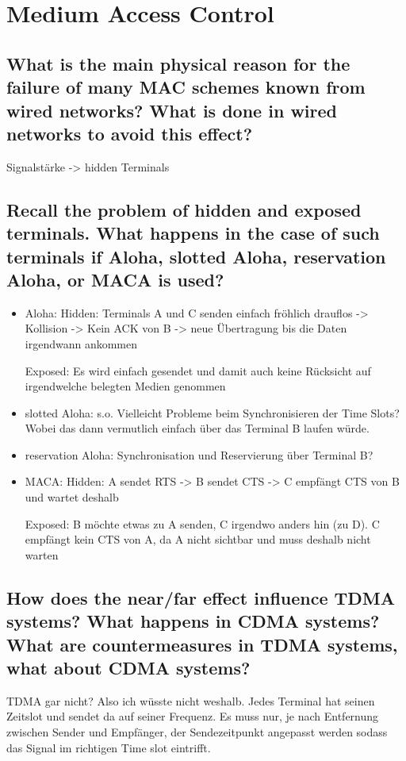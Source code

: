 \section{Medium Access Control}

\subsection{What is the main physical reason for the failure of many MAC schemes known from
wired networks? What is done in wired networks to avoid this effect?}
Signalstärke -> hidden Terminals


\subsection{Recall the problem of hidden and exposed terminals. What happens in the case of
such terminals if Aloha, slotted Aloha, reservation Aloha, or MACA is used?}
\begin{itemize}

\item Aloha: Hidden: Terminals A und C senden einfach fröhlich drauflos -> Kollision -> Kein ACK von B -> neue Übertragung bis die Daten irgendwann ankommen

Exposed: Es wird einfach gesendet und damit auch keine Rücksicht auf irgendwelche belegten Medien genommen

\item slotted Aloha: s.o. Vielleicht Probleme beim Synchronisieren der Time Slots? Wobei das dann vermutlich einfach über das Terminal B laufen würde.

\item reservation Aloha: Synchronisation und Reservierung über Terminal B? 

\item MACA: Hidden: A sendet RTS -> B sendet CTS -> C empfängt CTS von B und wartet deshalb

Exposed: B möchte etwas zu A senden, C irgendwo anders hin (zu D). C empfängt kein CTS von A, da A nicht sichtbar und muss deshalb nicht warten

\end{itemize}

\subsection{How does the near/far effect influence TDMA systems? What happens in CDMA
systems? What are countermeasures in TDMA systems, what about CDMA systems?}
TDMA gar nicht? Also ich wüsste nicht weshalb. Jedes Terminal hat seinen Zeitslot und sendet da auf seiner Frequenz. Es muss nur, je nach Entfernung zwischen Sender und Empfänger, der Sendezeitpunkt angepasst werden sodass das Signal im richtigen Time slot eintrifft.

